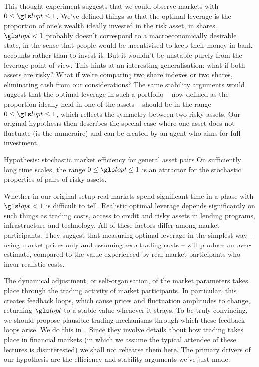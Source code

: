 This thought experiment suggests that we could observe markets with $0\leq\lopt\leq1$. We've defined things so that the optimal leverage is the proportion of one's wealth ideally invested in the risk asset, \ie in shares. $\lopt<1$ probably doesn't correspond to a macroeconomically desirable state, in the sense that people would be incentivised to keep their money in bank accounts rather than to invest it. But it wouldn't be unstable purely from the leverage point of view. This hints at an interesting generalisation: what if both assets are risky? What if we're comparing two share indexes or two shares, eliminating cash from our considerations? The same stability arguments would suggest that the optimal leverage in such a portfolio -- now defined as the proportion ideally held in one of the assets -- should be in the range $0\leq\lopt\leq1$, which reflects the symmetry between two risky assets. Our original hypothesis then describes the special case where one asset does not fluctuate (is the numeraire) and can be created by an agent who aims for full investment.

\begin{keypts}{Hypothesis: stochastic market efficiency for general asset pairs}
On sufficiently long time scales, the range $0\leq\lopt\leq1$ is an attractor for the stochastic properties of pairs of risky assets. 
\end{keypts}

Whether in our original setup real markets spend significant time in a phase with $\lopt<1$ is difficult to tell. Realistic optimal leverage depends significantly on such things as trading costs, access to credit and risky assets in lending programs, infrastructure and technology. All of these factors differ among market participants. They suggest that measuring optimal leverage in the simplest way -- using market prices only and assuming zero trading costs -- will produce an over-estimate, compared to the value experienced by real market participants who incur realistic costs.

The dynamical adjustment, or self-organisation, of the market parameters takes place through the trading activity of market participants. In particular, this creates feedback loops, which cause prices and fluctuation amplitudes to change, returning $\lopt$ to a stable value whenever it strays. To be truly convincing, we should propose plausible trading mechanisms through which these feedback loops arise. We do this in~\cite{PetersAdamou2011}. Since they involve details about how trading takes place in financial markets (in which we assume the typical attendee of these lectures is disinterested) we shall not rehearse them here. The primary drivers of our hypothesis are the efficiency and stability arguments we've just made.

